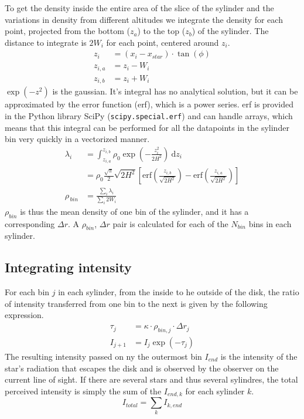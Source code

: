 \documentclass[a4paper, 12pt, english, titlepage]{article}
\newcommand{\erf}[1]{\textrm{erf}\left(#1\right)} %
\newcommand{\D}[1]{\ \mathrm{d}#1} %
\begin{document}
    To get the density inside the entire area of the slice of the sylinder and the variations in density from different altitudes we integrate the density for each point, projected from the bottom ($z_a$) to the top ($z_b$) of the sylinder. The distance to integrate is $2W_i$ for each point, centered around $z_i$.
    \begin{align*}
        z_i &= (x_i - x_{star}) \cdot \tan(\phi) \\
        z_{i,a} &= z_i - W_i \\
        z_{i,b} &= z_i + W_i
    \end{align*}
    $\exp(-z^2)$ is the gaussian. It's integral has no analytical solution, but it can be approximated by the error function (erf), which is a power series. erf is provided in the Python library SciPy (\texttt{scipy.special.erf}) and can handle arrays, which means that this integral can be performed for all the datapoints in the sylinder bin very quickly in a vectorized manner.
    \begin{align*}
        \lambda_i
        &= \int_{z_{i,a}}^{z_{i,b}} \rho_0 \exp\left(- \frac{z_i^2}{2H^2}\right) \D{z_i} \\
        &= \rho_0 \frac{\sqrt{\pi}}{2} \sqrt{2H^2}
        \left[ \erf{\frac{z_{i,b}}{\sqrt{2H^2}}} - \erf{\frac{z_{i,a}}{\sqrt{2H^2}}} \right] \\
        \rho_{\, bin} &= \frac{\sum_i \lambda_i}{\sum_i 2W_i}
    \end{align*}
    $\rho_{bin}$ is thus the mean density of one bin of the sylinder, and it has a corresponding $\Delta r$. A $\rho_{bin}$, $\Delta r$ pair is calculated for each of the $N_{bin}$ bins in each sylinder.


\subsection{Integrating intensity}
    For each bin $j$ in each sylinder, from the inside to he outside of the disk, the ratio of intensity transferred from one bin to the next is given by the following expression.
    \begin{align*}
        \tau_j &= \kappa \cdot \rho_{bin,j} \cdot \Delta r_j \\
        I_{j+1} &= I_j \exp(-\tau_j)
    \end{align*}
    The resulting intensity passed on ny the outermost bin $I_{end}$ is the intensity of the star's radiation that escapes the disk and is observed by the observer on the current line of sight. If there are several stars and thus several sylindres, the total perceived intensity is simply the sum of the $I_{end,k}$ for each sylinder $k$.
    $$
    I_{total} = \sum_k I_{k,end}
    $$
\end{document}

